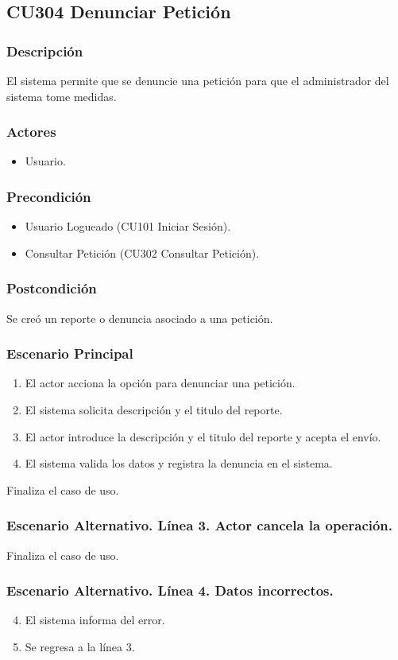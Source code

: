 \subsection{CU304 Denunciar Petici\'{o}n}
\subsubsection{Descripci\'{o}n}
El sistema permite que se denuncie una petici\'{o}n para que el administrador del sistema tome medidas.
\subsubsection{Actores}
\begin{itemize}
\item Usuario.
\end{itemize}
\subsubsection{Precondici\'{o}n}
\begin{itemize}
\item Usuario Logueado (CU101 Iniciar Sesi\'{o}n).
\item Consultar Petici\'{o}n (CU302 Consultar Petici\'{o}n).
\end{itemize}
\subsubsection{Postcondici\'{o}n}
Se cre\'{o} un reporte o denuncia asociado a una petici\'{o}n.
\subsubsection{Escenario Principal}
\begin{enumerate}
\item El actor acciona la opci\'{o}n para denunciar una petici\'{o}n.
\item El sistema solicita descripci\'{o}n y el titulo del reporte.
\item El actor introduce la descripci\'{o}n y el titulo del reporte y acepta el env\'{i}o.
\item El sistema valida los datos y registra la denuncia en el sistema.
\end{enumerate}
Finaliza el caso de uso.
\subsubsection{Escenario Alternativo. L\'{i}nea 3. Actor cancela la operaci\'{o}n.}
Finaliza el caso de uso.
\subsubsection{Escenario Alternativo. L\'{i}nea 4. Datos incorrectos.}
\begin{enumerate}
\setcounter{enumi}{3}
\item El sistema informa del error.
\item Se regresa a la l\'{i}nea 3.
\end{enumerate}